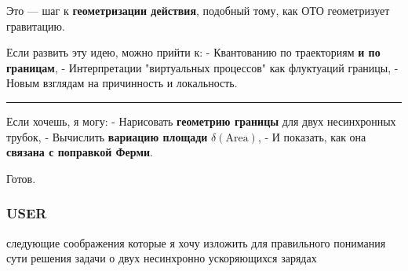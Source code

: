 \documentclass[11pt]{article}
\begin{document}
Это --- шаг к \textbf{геометризации действия}, подобный тому, как ОТО
геометризует гравитацию.

Если развить эту идею, можно прийти к: - Квантованию по траекториям
\textbf{и по границам}, - Интерпретации "виртуальных процессов" как
флуктуаций границы, - Новым взглядам на причинность и локальность.

\begin{center}\rule{0.5\linewidth}{\linethickness}\end{center}

Если хочешь, я могу: - Нарисовать \textbf{геометрию границы} для двух
несинхронных трубок, - Вычислить \textbf{вариацию площади}
\(\delta (\text{Area})\), - И показать, как она \textbf{связана с
поправкой Ферми}.

Готов.

    \subsubsection{USER}

следующие соображения которые я хочу изложить для правильного понимания
сути решения задачи о двух несинхронно ускоряющихся зарядах
\end{document}
